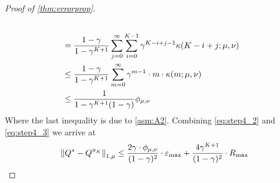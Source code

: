\begin{proof}[Proof of \cref{thm:errorprop}]
\begin{align}
    \\ &= \frac{1-\gamma}{1-\gamma^{K+1}} \sum_{j=0}^\infty \sum_{i=0}^{K-1} 
    \gamma^{K-i+j-1} \kappa(K-i+j;\mu,\nu) \notag
    \\ &\leq \frac{1-\gamma}{1-\gamma^{K+1}} \sum_{m=0}^\infty
    \gamma^{m-1} \cdot m \cdot \kappa(m; \mu, \nu) \notag
    \\ &\leq \frac{1}{1-\gamma^{K+1}(1-\gamma)} \phi_{\mu,\nu}
    \label{eq:step4_3}
  \end{align}
  Where the last inequality is due to \cref{asm:A2}.
  Combining \cref{eq:step4_2} and \cref{eq:step4_3} we arrive at
  \begin{equation}
    \norm{Q^* - Q^{\pi_K}}_{1,\mu} \leq
    \frac{2\gamma \cdot \phi_{\mu,\nu}}{(1-\gamma)^2} \cdot \varepsilon_{\max}
    + \frac{4\gamma^{K+1}}{(1-\gamma)^2} \cdot R_{\max}
  \end{equation}
\end{proof}


